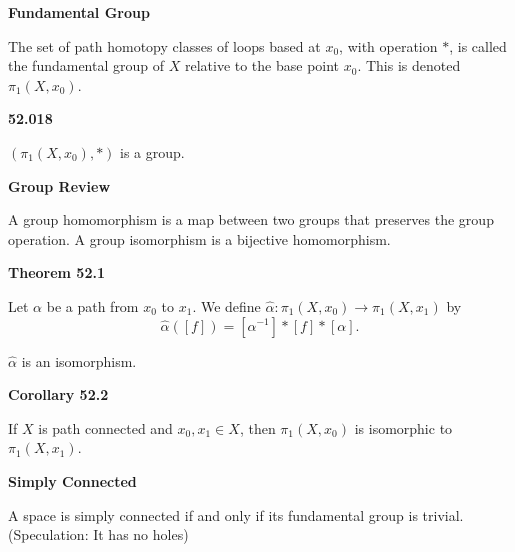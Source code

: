 \documentclass{article}
\begin{document}
\medskip\noindent\textbf{Fundamental Group}

    The set of path homotopy classes of loops based at $x_0$, with operation $*$, is called the fundamental group of $X$ relative to the base point $x_0$. This is denoted $\pi_1(X,x_0)$.

\medskip\noindent\textbf{52.018}

    $(\pi_1(X,x_0), *)$ is a group.

\medskip\noindent\textbf{Group Review}

    A group homomorphism is a map between two groups that preserves the group operation.
    A group isomorphism is a bijective homomorphism.

\medskip\noindent\textbf{Theorem 52.1}

    Let $\alpha$ be a path from $x_0$ to $x_1$. We define $\hat\alpha: \pi_1(X,x_0) \to \pi_1(X, x_1)$ by $$\hat\alpha([f]) = [\alpha^{-1}] * [f] * [\alpha].$$

    $\hat\alpha$ is an isomorphism.

\medskip\noindent\textbf{Corollary 52.2}

    If $X$ is path connected and $x_0, x_1 \in X$, then $\pi_1(X, x_0)$ is isomorphic to $\pi_1(X, x_1)$.

\medskip\noindent\textbf{Simply Connected}

    A space is simply connected if and only if its fundamental group is trivial. (Speculation: It has no holes)
\end{document}
